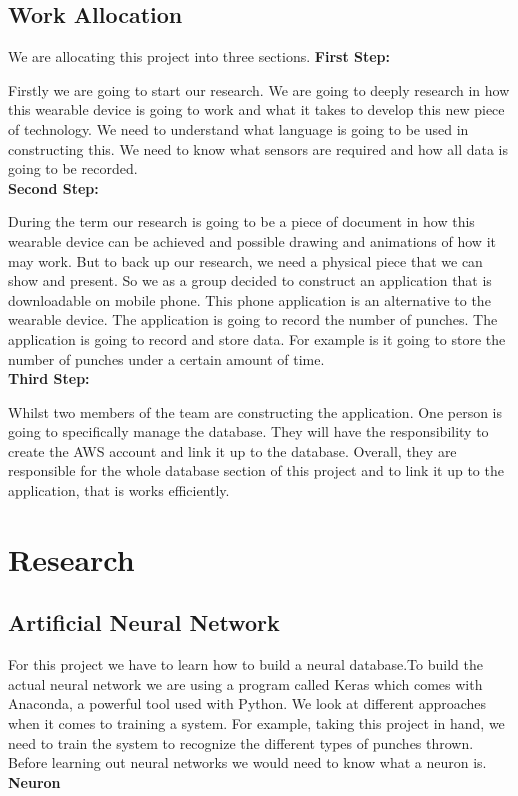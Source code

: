 \documentclass[conference,compsoc]{IEEEtran}
\begin{document}
\subsection*{Work Allocation}
We are allocating this project into three sections.
\textbf{First Step:}

Firstly we are going to start our research. We are going to deeply research in how this wearable device is going to work and what it takes to develop this new piece of technology. We need to understand what language is going to be used in constructing this. We need to know what sensors are required and how all data is going to be recorded.
\\
\textbf{Second Step:}

During the term our research is going to be a piece of document in how this wearable device can be achieved and possible drawing and animations of how it may work. But to back up our research, we need a physical piece that we can show and present. So we as a group decided to construct an application that is downloadable on mobile phone. This phone application is an alternative to the wearable device. The application is going to record the number of punches. The application is going to record and store data. For example is it going to store the number of punches under a certain amount of time.
\\
\textbf{Third Step:}

Whilst two members of the team are constructing the application. One person is going to specifically manage the database. They will have the responsibility to create the AWS account and link it up to the database. Overall, they are responsible for the whole database section of this project and to link it up to the application, that is works efficiently.

\section{Research}

\subsection*{Artificial Neural Network}
For this project we have to learn how to build a neural database.To build the actual neural network we are using a program called Keras which comes with Anaconda, a powerful tool used with Python. We look at different approaches when it comes to training a system. For example, taking this project in hand, we need to train the system to recognize the different types of punches thrown. Before learning out neural networks we would need to know what a neuron is.\\
\textbf{Neuron}
\end{document}
